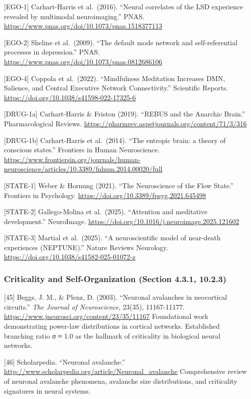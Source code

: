 \documentclass[
  11pt,
]{article}
\begin{document}
{[}EGO-1{]} Carhart-Harris et al.~(2016). ``Neural correlates of the LSD
experience revealed by multimodal neuroimaging.'' PNAS.
\url{https://www.pnas.org/doi/10.1073/pnas.1518377113}

{[}EGO-2{]} Sheline et al.~(2009). ``The default mode network and
self-referential processes in depression.'' PNAS.
\url{https://www.pnas.org/doi/10.1073/pnas.0812686106}

{[}EGO-4{]} Coppola et al.~(2022). ``Mindfulness Meditation Increases
DMN, Salience, and Central Executive Network Connectivity.'' Scientific
Reports. \url{https://doi.org/10.1038/s41598-022-17325-6}

{[}DRUG-1a{]} Carhart-Harris \& Friston (2019). ``REBUS and the Anarchic
Brain.'' Pharmacological Reviews.
\url{https://pharmrev.aspetjournals.org/content/71/3/316}

{[}DRUG-1b{]} Carhart-Harris et al.~(2014). ``The entropic brain: a
theory of conscious states.'' Frontiers in Human Neuroscience.
\url{https://www.frontiersin.org/journals/human-neuroscience/articles/10.3389/fnhum.2014.00020/full}

{[}STATE-1{]} Weber \& Hornung (2021). ``The Neuroscience of the Flow
State.'' Frontiers in Psychology.
\url{https://doi.org/10.3389/fpsyg.2021.645498}

{[}STATE-2{]} Gallego-Molina et al.~(2025). ``Attention and meditative
development.'' NeuroImage.
\url{https://doi.org/10.1016/j.neuroimage.2025.121602}

{[}STATE-3{]} Martial et al.~(2025). ``A neuroscientific model of
near-death experiences (NEPTUNE).'' Nature Reviews Neurology.
\url{https://doi.org/10.1038/s41582-025-01072-z}

\subsubsection{Criticality and Self-Organization (Section 4.3.1,
10.2.3)}\label{criticality-and-self-organization-section-4.3.1-10.2.3}

{[}45{]} Beggs, J. M., \& Plenz, D. (2003). ``Neuronal avalanches in
neocortical circuits.'' \emph{The Journal of Neuroscience}, 23(35),
11167-11177. \url{https://www.jneurosci.org/content/23/35/11167}
Foundational work demonstrating power-law distributions in cortical
networks. Established branching ratio σ ≈ 1.0 as the hallmark of
criticality in biological neural networks.

{[}46{]} Scholarpedia. ``Neuronal avalanche.''
\url{http://www.scholarpedia.org/article/Neuronal_avalanche}
Comprehensive review of neuronal avalanche phenomena, avalanche size
distributions, and criticality signatures in neural systems.
\end{document}
